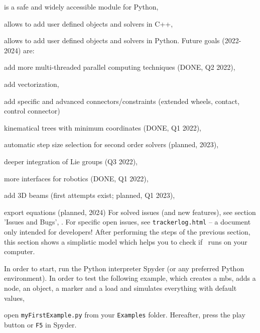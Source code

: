  \item is a safe and widely accessible module for Python,
  \item allows to add user defined objects and solvers in C++,
  \item allows to add user defined objects and solvers in Python.
\ei
Future goals (2022-2024) are:
\bi
  \item add more multi-threaded parallel computing techniques (DONE, Q2 2022),
  \item add vectorization,
  \item add specific and advanced connectors/constraints (extended wheels, contact, control connector)
  \item kinematical trees with minimum coordinates (DONE, Q1 2022),
  \item automatic step size selection for second order solvers (planned, 2023),
  \item deeper integration of Lie groups (Q3 2022),
  \item more interfaces for robotics (DONE, Q1 2022),
  \item add 3D beams (first attempts exist; planned, Q1 2023),
  \item export equations (planned, 2024)
\ei
For solved issues (and new features), see section 'Issues and Bugs', .
For specific open issues, see \texttt{trackerlog.html} -- a document only intended for developers!
%
After performing the steps of the previous section, this section shows a simplistic model which helps you to check if \codeName\ runs on your computer.

In order to start, run the Python interpreter Spyder (or any preferred Python environment).
In order to test the following example, which creates a \ac{mbs}, adds a node, an object, a marker and a load and simulates everything with default values, 
\bi
{}
\item open \texttt{myFirstExample.py} from your \texttt{Examples} folder.
\ei
Hereafter, press the play button or \texttt{F5} in Spyder.
%

